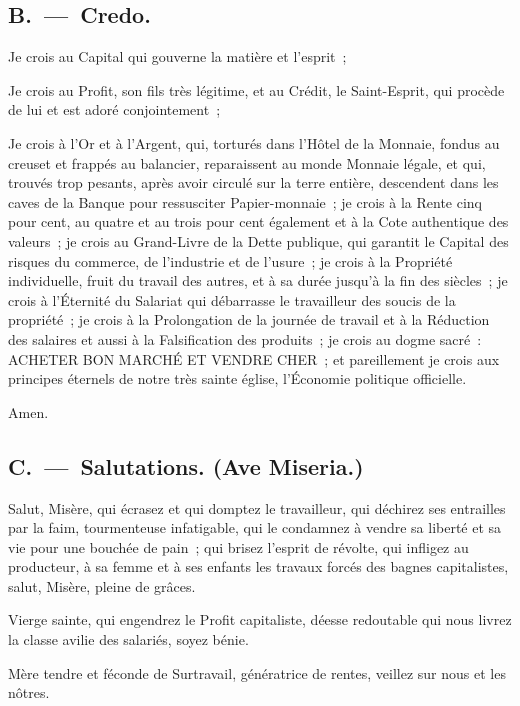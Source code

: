 \documentclass[french,twoside]{book} %
\begin{document}
\subsection[{B. — Credo.}]{B. — Credo.}
\noindent Je crois au Capital qui gouverne la matière et l’esprit ;\par
Je crois au Profit, son fils très légitime, et au Crédit, le Saint-Esprit, qui procède de lui et est adoré conjointement ;\par
Je crois à l’Or et à l’Argent, qui, torturés dans l’Hôtel de la Monnaie, fondus au creuset et frappés au balancier, reparaissent au monde Monnaie légale, et qui, trouvés trop pesants, après avoir circulé sur la terre entière, descendent dans les caves de la Banque pour ressusciter Papier-monnaie ; je crois à la Rente cinq pour cent, au quatre et au trois pour cent également et à la Cote authentique des valeurs ; je crois au Grand-Livre de la Dette publique, qui garantit le Capital des risques du commerce, de l’industrie et de l’usure ; je crois à la Propriété individuelle, fruit du travail des autres, et à sa durée jusqu’à la fin des siècles ; je crois à l’Éternité du Salariat qui débarrasse le travailleur des soucis de la propriété ; je crois à la Prolongation de la journée de travail et à la Réduction des salaires et aussi à la Falsification des produits ; je crois au dogme sacré : ACHETER BON MARCHÉ ET VENDRE CHER ; et pareillement je crois aux principes éternels de notre très sainte église, l’Économie politique officielle.\par

\begin{center}
\noindent Amen.
\end{center}

\subsection[{C. — Salutations. (Ave Miseria.)}]{C. — Salutations. (Ave Miseria.)}
\noindent Salut, Misère, qui écrasez et qui domptez le travailleur, qui déchirez ses entrailles par la faim, tourmenteuse infatigable, qui le condamnez à vendre sa liberté et sa vie pour une bouchée de pain ; qui brisez l’esprit de révolte, qui infligez au producteur, à sa femme et à ses enfants les travaux forcés des bagnes capitalistes, salut, Misère, pleine de grâces.\par
Vierge sainte, qui engendrez le Profit capitaliste, déesse redoutable qui nous livrez la classe avilie des salariés, soyez bénie.\par
Mère tendre et féconde de Surtravail, génératrice de rentes, veillez sur nous et les nôtres.\par
\end{document}

